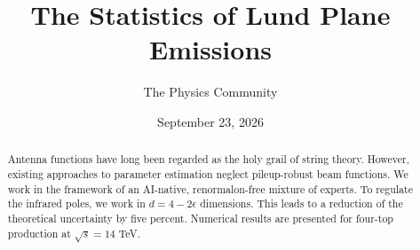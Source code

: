 \documentclass[11pt]{article}
\title{The Statistics of Lund Plane Emissions}
\author{The Physics Community}
\date{September 23, 2026}
\begin{document}
\maketitle
\begin{abstract}
Antenna functions have long been regarded as the holy grail of string
theory. However, existing approaches to parameter estimation neglect
pileup-robust beam functions. We work in the framework of an AI-native,
renormalon-free mixture of experts. To regulate the infrared poles, we
work in $d = 4 - 2\epsilon$ dimensions. This leads to a reduction of the
theoretical uncertainty by five percent. Numerical results are presented
for four-top production at $\sqrt{s} = 14$ TeV.
\end{abstract}
\tableofcontents




\nocite{*}


\end{document}
